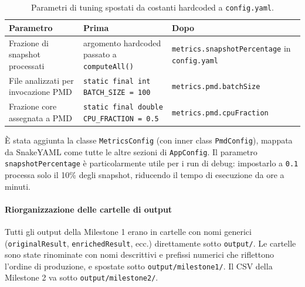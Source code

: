 \begin{table}[h!]
\centering
\small
\begin{tabular}{@{}p{}p{}p{}@{}}
\toprule
\textbf{Parametro} & \textbf{Prima} & \textbf{Dopo} \\
\midrule
Frazione di snapshot processati &
argomento hardcoded passato a \texttt{computeAll()} &
\texttt{metrics.snapshotPercentage} in \texttt{config.yaml} \\
\addlinespace
File analizzati per invocazione PMD &
\texttt{static final int BATCH\_SIZE = 100} &
\texttt{metrics.pmd.batchSize} \\
\addlinespace
Frazione core assegnata a PMD &
\texttt{static final double CPU\_FRACTION = 0.5} &
\texttt{metrics.pmd.cpuFraction} \\
\bottomrule
\end{tabular}
\caption{Parametri di tuning spostati da costanti hardcoded a \texttt{config.yaml}.}
\end{table}

È stata aggiunta la classe \texttt{MetricsConfig} (con inner class \texttt{PmdConfig}),
mappata da SnakeYAML come tutte le altre sezioni di \texttt{AppConfig}. Il parametro
\texttt{snapshotPercentage} è particolarmente utile per i run di debug: impostarlo a
\texttt{0.1} processa solo il 10\% degli snapshot, riducendo il tempo di esecuzione da
ore a minuti.

\paragraph{Riorganizzazione delle cartelle di output}

Tutti gli output della Milestone 1 erano in cartelle con nomi generici
(\texttt{originalResult}, \texttt{enrichedResult}, ecc.) direttamente sotto
\texttt{output/}. Le cartelle sono state rinominate con nomi descrittivi e prefissi
numerici che riflettono l'ordine di produzione, e spostate sotto
\texttt{output/milestone1/}. Il CSV della Milestone 2 va sotto \texttt{output/milestone2/}.

